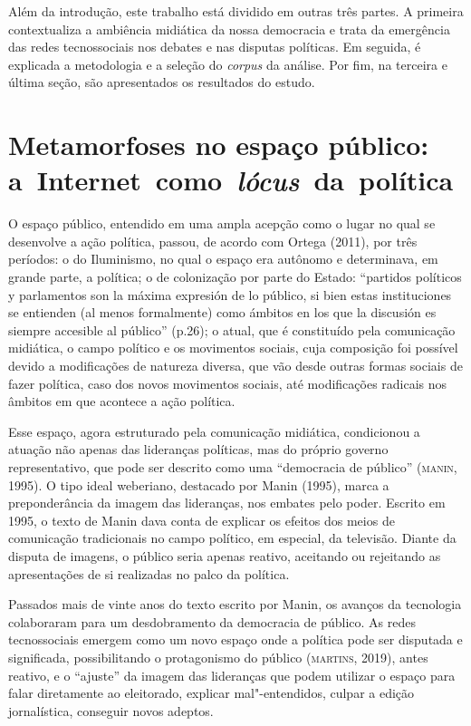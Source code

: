 Além da introdução, este trabalho está dividido em outras três partes. A
primeira contextualiza a ambiência midiática da nossa democracia e trata
da emergência das redes tecnossociais nos debates e nas disputas
políticas. Em seguida, é explicada a metodologia e a seleção do
\emph{corpus} da análise. Por fim, na terceira e última seção, são
apresentados os resultados do estudo.

\section{Metamorfoses no espaço público: a~Internet~como~\emph{lócus}~da~política}

O espaço público, entendido em uma ampla acepção como o lugar no qual se
desenvolve a ação política, passou, de acordo com Ortega (2011), por
três períodos: o do Iluminismo, no qual o espaço era autônomo e
determinava, em grande parte, a política; o de colonização por parte do
Estado: ``partidos políticos y parlamentos son la máxima expresión de lo
público, si bien estas instituciones se entienden (al menos formalmente)
como ámbitos en los que la discusión es siempre accesible al público''
(p.26); o atual, que é constituído pela comunicação midiática, o campo
político e os movimentos sociais, cuja composição foi possível devido a
modificações de natureza diversa, que vão desde outras formas sociais de
fazer política, caso dos novos movimentos sociais, até modificações
radicais nos âmbitos em que acontece a ação política.

Esse espaço, agora estruturado pela comunicação midiática, condicionou a
atuação não apenas das lideranças políticas, mas do próprio governo
representativo, que pode ser descrito como uma ``democracia de público''
(\textsc{manin}, 1995). O tipo ideal weberiano, destacado por Manin (1995), marca
a preponderância da imagem das lideranças, nos embates pelo poder.
Escrito em 1995, o texto de Manin dava conta de explicar os efeitos dos
meios de comunicação tradicionais no campo político, em especial, da
televisão. Diante da disputa de imagens, o público seria apenas reativo,
aceitando ou rejeitando as apresentações de si realizadas no palco da
política.

Passados mais de vinte anos do texto escrito por Manin, os avanços da
tecnologia colaboraram para um desdobramento da democracia de público.
As redes tecnossociais emergem como um novo espaço onde a política pode
ser disputada e significada, possibilitando o protagonismo do público
(\textsc{martins}, 2019), antes reativo, e o ``ajuste'' da imagem das lideranças
que podem utilizar o espaço para falar diretamente ao eleitorado,
explicar mal"-entendidos, culpar a edição jornalística, conseguir novos
adeptos.

